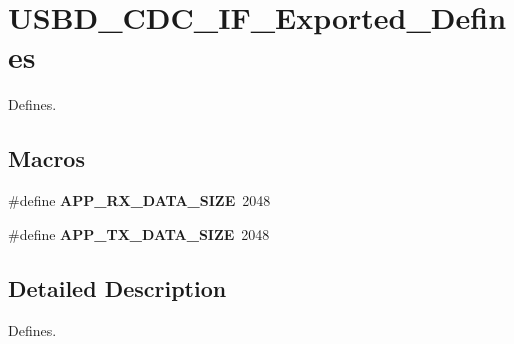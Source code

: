\hypertarget{group__USBD__CDC__IF__Exported__Defines}{}\section{U\+S\+B\+D\+\_\+\+C\+D\+C\+\_\+\+I\+F\+\_\+\+Exported\+\_\+\+Defines}
\label{group__USBD__CDC__IF__Exported__Defines}


Defines.  


\subsection*{Macros}
\begin{DoxyCompactItemize}
\item 
\mbox{\label{group__USBD__CDC__IF__Exported__Defines_gaf3db03a3d03a80e1ec7a0a9c470d9692}} 
\#define {\bfseries A\+P\+P\+\_\+\+R\+X\+\_\+\+D\+A\+T\+A\+\_\+\+S\+I\+ZE}~2048
\item 
\mbox{\label{group__USBD__CDC__IF__Exported__Defines_gaff35924b436331d533599db9489c79ee}} 
\#define {\bfseries A\+P\+P\+\_\+\+T\+X\+\_\+\+D\+A\+T\+A\+\_\+\+S\+I\+ZE}~2048
\end{DoxyCompactItemize}


\subsection{Detailed Description}
Defines. 

